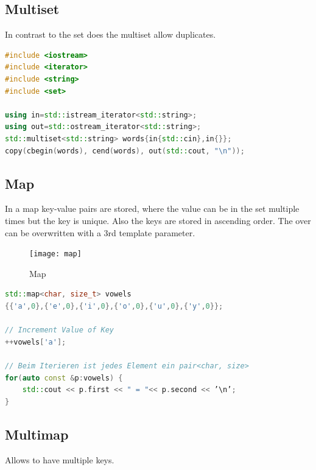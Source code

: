 \subsection{Multiset}
In contrast to the set does the multiset allow duplicates.
\begin{lstlisting}[language=C++]
#include <iostream>
#include <iterator>
#include <string>
#include <set>

using in=std::istream_iterator<std::string>;
using out=std::ostream_iterator<std::string>;
std::multiset<std::string> words{in{std::cin},in{}};
copy(cbegin(words), cend(words), out(std::cout, "\n"));
\end{lstlisting}

\subsection{Map}
In a map key-value pairs are stored, where the value can be in the set multiple times but the key is unique. Also the keys are stored in ascending order. The over can be overwritten with a 3rd template parameter.
\begin{figure}[h!]
  \centering
  \texttt{[image: map]}
  \caption{Map}
\end{figure}
\begin{lstlisting}[language=C++]
std::map<char, size_t> vowels
{{'a',0},{'e',0},{'i',0},{'o',0},{'u',0},{'y',0}};

// Increment Value of Key
++vowels['a'];

// Beim Iterieren ist jedes Element ein pair<char, size>
for(auto const &p:vowels) {
	std::cout << p.first << " = "<< p.second << ’\n’;
}
\end{lstlisting}

\subsection{Multimap}
Allows to have multiple keys.


\pagebreak
